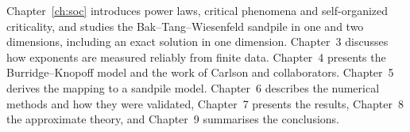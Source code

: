Chapter~\ref{ch:soc} introduces power laws, critical phenomena and self-organized criticality, and studies the
Bak--Tang--Wiesenfeld sandpile in one and two dimensions, including an exact solution in one dimension.
Chapter~3 discusses how exponents are measured reliably from finite data. Chapter~4 presents the
Burridge--Knopoff model and the work of Carlson and collaborators. Chapter~5 derives the mapping to a sandpile
model. Chapter~6 describes the numerical methods and how they were validated, Chapter~7 presents the results,
Chapter~8 the approximate theory, and Chapter~9 summarises the conclusions.

